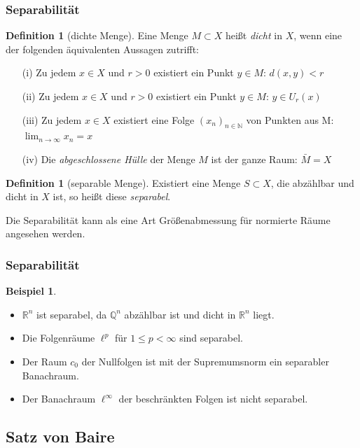 \documentclass[t, handout]{beamer}
\newcommand{\N}{\mathbb{N}}
\newcommand{\Q}{\mathbb{Q}}
\newcommand{\R}{\mathbb{R}}
\theoremstyle{definition} %
\newtheorem{dfi}[sa]{Definition} %
\newtheorem*{bsp}{Beispiel}
\begin{document}
\begin{frame}
\frametitle{Separabilität}
\begin{dfi}[dichte Menge]
Eine Menge $M \subset X$ heißt \textit{dicht} in $X$, wenn eine der folgenden äquivalenten Aussagen zutrifft:
\begin{itemize}
\item[(i)] Zu jedem $x \in X$ und  $r > 0$ existiert ein Punkt $y \in M$: $d(x,y)<r$
\item[(ii)] Zu jedem $x \in X$ und  $r > 0$ existiert ein Punkt $y \in M$: $y \in U_r (x)$
\item[(iii)] Zu jedem $x \in X$ existiert eine Folge ${(x_n)}_{n \in \N}$ von Punkten aus M: $\lim_{n \to \infty}{x_n} = x$
\item[(iv)] Die \textit{abgeschlossene Hülle} der Menge $M$ ist der ganze Raum: $\bar{M} = X$
\end{itemize}
\end{dfi}
\pause
\begin{dfi}[separable Menge]
Existiert eine Menge $S \subset X$, die abzählbar und dicht in $X$ ist, so heißt diese \textit{separabel}.
\end{dfi}
\pause
Die Separabilität kann als eine Art Größenabmessung für normierte Räume angesehen werden.
\end{frame}

\begin{frame}
\frametitle{Separabilität}
\begin{bsp}
\begin{itemize}
\item $\R^n$ ist separabel, da $\Q^n$ abzählbar ist und dicht in $\R^n$ liegt.
\item Die Folgenräume $\ell^p$ für $1 \leq p < \infty$ sind separabel.
\item Der Raum $c_0$ der Nullfolgen ist mit der Supremumsnorm ein separabler Banachraum.
\item Der Banachraum $\ell^\infty$ der beschränkten Folgen ist nicht separabel.
\end{itemize}
\end{bsp}
\end{frame}

\subsection{Satz von Baire}
\end{document}
